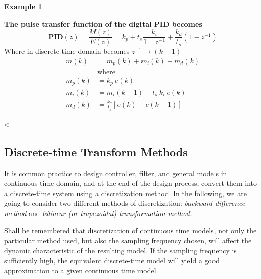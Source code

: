 \documentclass[11pt,a4paper,oneside]{book}
\numberwithin{equation}{section}
\theoremstyle{it}
\theoremstyle{definition}
\newtheorem{example}{Example}[chapter]
\begin{document}
\begin{example}
\begin{mybox}
\textbf{	The pulse transfer function of the digital \textbf{PID} becomes}
	\begin{equation}
		\textbf{PID}(z) = \frac{M(z)}{E(z)} = k_p + t_s \frac{k_i}{1-z^{-1}} + 
		\frac{k_d}{t_s}(1-z^{-1})
	\end{equation}
Where in discrete time domain becomes $z^{-1} \rightarrow (k-1)$
\begin{equation}
	\begin{split}
		m(k) &= m_p(k) + m_i(k) + m_d(k)  \\[6pt]
		&\text{where} \\[6pt]
		m_p(k) &= k_p \ e(k) \\[6pt]
		m_i(k) &= m_i(k-1) + t_s \ k_i \ e(k) \\[6pt]
		m_d(k) &= \frac{k_d}{t_s} \left[e(k)-e(k-1) \right] 
	\end{split}
\end{equation}
\end{mybox}
$\triangleleft$ 
\end{example}

\subsection{Discrete-time Transform Methods}
It is common practice to design controller, filter, and general models in 
continuous time domain, and at the end of the design process, convert them into 
a discrete-time system using a discretization method. In the following, we are 
going to consider two different methods of discretization: \textit{backward 
difference method} and \textit{bilinear (or trapezoidal) transformation method}.

Shall be remembered that discretization of continuous time models, not only the particular method used, but also the sampling frequency chosen, will affect the dynamic characteristic of the resulting model. If the sampling frequency is sufficiently high, the equivalent discrete-time model will yield a good approximation to a given continuous time model.
\end{document}
